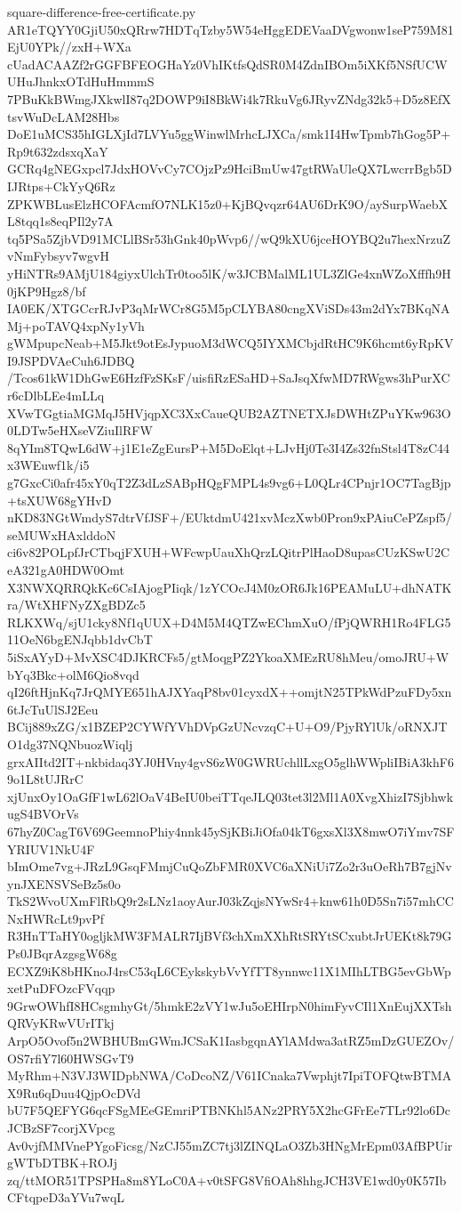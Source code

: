 \documentclass[11pt]{article}
\theoremstyle{definition}
\theoremstyle{remark}
\begin{document}
\begin{filecontents*}[overwrite]{square-difference-free-certificate.py}
AR1eTQYY0GjiU50xQRrw7HDTqTzby5W54eHggEDEVaaDVgwonw1seP759M81EjU0YPk//zxH+WXa
cUadACAAZf2rGGFBFEOGHaYz0VhIKtfsQdSR0M4ZdnIBOm5iXKf5NSfUCWUHuJhnkxOTdHuHmmmS
7PBuKkBWmgJXkwlI87q2DOWP9iI8BkWi4k7RkuVg6JRyvZNdg32k5+D5z8EfXtsvWuDcLAM28Hbs
DoE1uMCS35hIGLXjId7LVYu5ggWinwlMrhcLJXCa/smk1I4HwTpmb7hGog5P+Rp9t632zdsxqXaY
GCRq4gNEGxpcl7JdxHOVvCy7COjzPz9HciBmUw47gtRWaUleQX7LwcrrBgb5DIJRtps+CkYyQ6Rz
ZPKWBLusElzHCOFAcmfO7NLK15z0+KjBQvqzr64AU6DrK9O/aySurpWaebXL8tqq1s8eqPIl2y7A
tq5PSa5ZjbVD91MCLlBSr53hGnk40pWvp6//wQ9kXU6jceHOYBQ2u7hexNrzuZvNmFybsyv7wgvH
yHiNTRs9AMjU184giyxUlchTr0too5lK/w3JCBMalML1UL3ZlGe4xnWZoXfffh9H0jKP9Hgz8/bf
IA0EK/XTGCcrRJvP3qMrWCr8G5M5pCLYBA80cngXViSDs43m2dYx7BKqNAMj+poTAVQ4xpNy1yVh
gWMpupcNeab+M5Jkt9otEsJypuoM3dWCQ5IYXMCbjdRtHC9K6hcmt6yRpKVI9JSPDVAeCuh6JDBQ
/Tcos61kW1DhGwE6HzfFzSKsF/uisfiRzESaHD+SaJsqXfwMD7RWgws3hPurXCr6cDlbLEe4mLLq
XVwTGgtiaMGMqJ5HVjqpXC3XxCaueQUB2AZTNETXJsDWHtZPuYKw963O0LDTw5eHXseVZiuIlRFW
8qYIm8TQwL6dW+j1E1eZgEursP+M5DoElqt+LJvHj0Te3I4Zs32fnStsl4T8zC44x3WEuwf1k/i5
g7GxcCi0afr45xY0qT2Z3dLzSABpHQgFMPL4s9vg6+L0QLr4CPnjr1OC7TagBjp+tsXUW68gYHvD
nKD83NGtWmdyS7dtrVfJSF+/EUktdmU421xvMczXwb0Pron9xPAiuCePZspf5/seMUWxHAxlddoN
ci6v82POLpfJrCTbqjFXUH+WFcwpUauXhQrzLQitrPlHaoD8upasCUzKSwU2CeA321gA0HDW0Omt
X3NWXQRRQkKc6CsIAjogPIiqk/1zYCOcJ4M0zOR6Jk16PEAMuLU+dhNATKra/WtXHFNyZXgBDZc5
RLKXWq/sjU1cky8Nf1qUUX+D4M5M4QTZwEChmXuO/fPjQWRH1Ro4FLG511OeN6bgENJqbb1dvCbT
5iSxAYyD+MvXSC4DJKRCFs5/gtMoqgPZ2YkoaXMEzRU8hMeu/omoJRU+WbYq3Bkc+olM6Qio8vqd
qI26ftHjnKq7JrQMYE651hAJXYaqP8bv01cyxdX++omjtN25TPkWdPzuFDy5xn6tJcTuUlSJ2Eeu
BCij889xZG/x1BZEP2CYWfYVhDVpGzUNcvzqC+U+O9/PjyRYlUk/oRNXJTO1dg37NQNbuozWiqlj
grxAIItd2IT+nkbidaq3YJ0HVny4gvS6zW0GWRUchllLxgO5glhWWpliIBiA3khF69o1L8tUJRrC
xjUnxOy1OaGfF1wL62lOaV4BeIU0beiTTqeJLQ03tet3l2Ml1A0XvgXhizI7SjbhwkugS4BVOrVs
67hyZ0CagT6V69GeemnoPhiy4nnk45ySjKBiJiOfa04kT6gxsXl3X8mwO7iYmv7SFYRIUV1NkU4F
bImOme7vg+JRzL9GsqFMmjCuQoZbFMR0XVC6aXNiUi7Zo2r3uOeRh7B7gjNvynJXENSVSeBz5s0o
TkS2WvoUXmFlRbQ9r2sLNz1aoyAurJ03kZqjsNYwSr4+knw61h0D5Sn7i57mhCCNxHWRcLt9pvPf
R3HnTTaHY0ogljkMW3FMALR7IjBVf3chXmXXhRtSRYtSCxubtJrUEKt8k79GPs0JBqrAzgsgW68g
ECXZ9iK8bHKnoJ4rsC53qL6CEykskybVvYfTT8ynnwc11X1MIhLTBG5evGbWpxetPuDFOzcFVqqp
9GrwOWhfI8HCsgmhyGt/5hmkE2zVY1wJu5oEHIrpN0himFyvCIl1XnEujXXTshQRVyKRwVUrITkj
ArpO5Ovof5n2WBHUBmGWmJCSaK1IasbgqnAYlAMdwa3atRZ5mDzGUEZOv/OS7rfiY7l60HWSGvT9
MyRhm+N3VJ3WIDpbNWA/CoDcoNZ/V61ICnaka7Vwphjt7IpiTOFQtwBTMAX9Ru6qDuu4QjpOcDVd
bU7F5QEFYG6qcFSgMEeGEmriPTBNKhl5ANz2PRY5X2hcGFrEe7TLr92lo6DcJCBzSF7corjXVpcg
Av0vjfMMVnePYgoFicsg/NzCJ55mZC7tj3lZINQLaO3Zb3HNgMrEpm03AfBPUirgWTbDTBK+ROJj
zq/ttMOR51TPSPHa8m8YLoC0A+v0tSFG8VfiOAh8hhgJCH3VE1wd0y0K57IbCFtqpeD3aYVu7wqL

\end{filecontents*}
\end{document}
